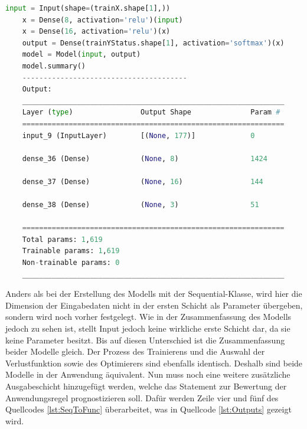 \begin{lstlisting}[language = python, caption={Modell mit funktionaler \acs{API} darstellen},captionpos=b, label = lst:SeqToFunc, floatplacement=H]
    input = Input(shape=(trainX.shape[1],))
    x = Dense(8, activation='relu')(input)
    x = Dense(16, activation='relu')(x)
    output = Dense(trainYStatus.shape[1], activation='softmax')(x)
    model = Model(input, output)
    model.summary()
    ---------------------------------------
    Output:
    ______________________________________________________________
    Layer (type)                Output Shape              Param #   
    ==============================================================
    input_9 (InputLayer)        [(None, 177)]             0         
                                                                    
    dense_36 (Dense)            (None, 8)                 1424      
                                                                    
    dense_37 (Dense)            (None, 16)                144       
                                                                    
    dense_38 (Dense)            (None, 3)                 51        
                                                                    
    ==============================================================
    Total params: 1,619
    Trainable params: 1,619
    Non-trainable params: 0
    ______________________________________________________________

\end{lstlisting}

Anders als bei der Erstellung des Modells mit der \glqq Sequential\grqq{}-Klasse, wird hier die Dimension der Eingabedaten nicht in der ersten Schicht als Parameter übergeben,
sondern wird noch vorher festgelegt. Wie in der Zusammenfassung des Modells jedoch zu sehen ist, stellt \glqq Input\grqq{} jedoch keine wirkliche erste Schicht dar,
da sie keine Parameter besitzt. Bis auf diesen Unterschied ist die Zusammenfassung beider Modelle gleich. Der Prozess des Trainierens und die Auswahl der Verlustfunktion
sowie des Optimierers sind ebenfalls identisch. Deshalb sind beide Modelle in der Anwendung äquivalent. Nun muss noch eine weitere zusätzliche Ausgabeschicht hinzugefügt werden,
welche das Statement zur Bewertung der Anwendungsregel prognostizieren soll. Dafür werden Zeile vier und fünf des Quellcodes \ref*{lst:SeqToFunc} überarbeitet, was 
in Quellcode \ref*{lst:Outputs} gezeigt wird.

